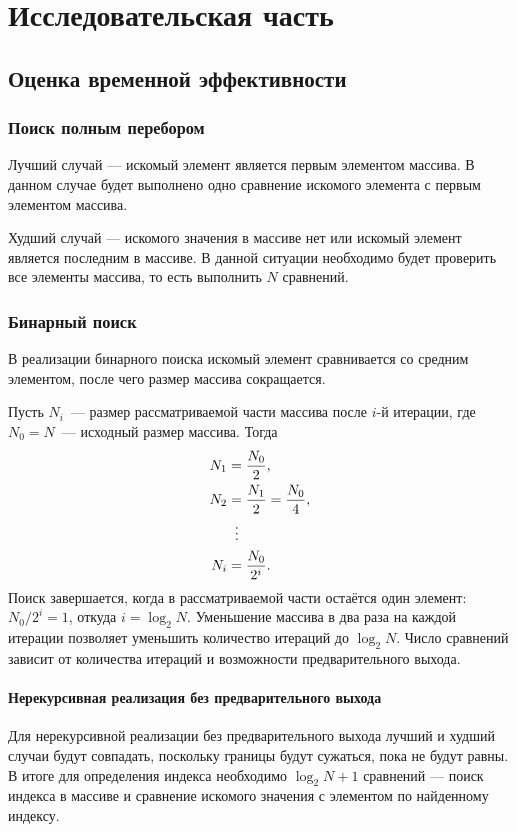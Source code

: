 \chapter{Исследовательская часть}

\section{Оценка временной эффективности}
\subsection{Поиск полным перебором}
Лучший случай --- искомый элемент является первым элементом массива. В данном случае будет выполнено одно сравнение искомого элемента с первым элементом массива.

Худший случай --- искомого значения в массиве нет или искомый элемент является последним в массиве. В данной ситуации необходимо будет проверить все элементы массива, то есть выполнить $N$ сравнений.

\subsection{Бинарный поиск}
В реализации бинарного поиска искомый элемент сравнивается со средним элементом, после чего размер массива сокращается.

Пусть $N_i$~--- размер рассматриваемой части массива после $i$-й итерации, где $N_0 = N$~--- исходный размер массива. Тогда
\begin{align}
	N_1 &= \frac{N_0}{2}, \notag \\
	N_2 &= \frac{N_1}{2} = \frac{N_0}{4}, \notag \\
	&\;\;\vdots \notag \\
	N_i &= \frac{N_0}{2^i}.
\end{align}
Поиск завершается, когда в рассматриваемой части остаётся один элемент: $N_0 / 2^i = 1$, откуда $i = \log_2 N$.
Уменьшение массива в два раза на каждой итерации позволяет уменьшить количество итераций до $\log_2N$. Число сравнений зависит от количества итераций и возможности предварительного выхода.

\subsubsection{Нерекурсивная реализация без предварительного выхода}
Для нерекурсивной реализации без предварительного выхода лучший и худший случаи будут совпадать, поскольку границы будут сужаться, пока не будут равны. В итоге для определения индекса необходимо $\log_2N + 1$ сравнений --- поиск индекса в массиве и сравнение искомого значения с элементом по найденному индексу.

